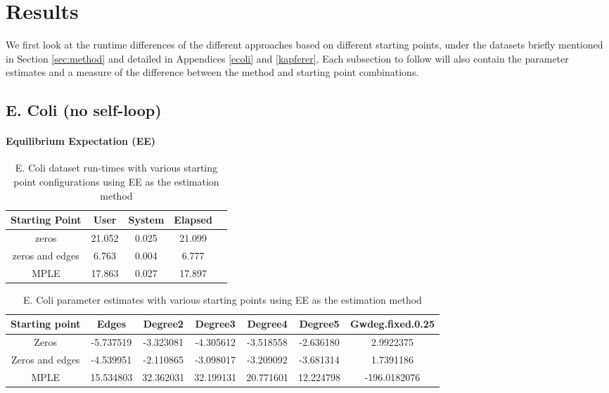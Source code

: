 \section{Results}
\label{sec:results}

We first look at the runtime differences of the different approaches based on different starting points, under the datasets briefly mentioned in Section \ref{sec:method} and detailed in Appendices \ref{ecoli} and \ref{kapferer}. Each subsection to follow will also contain the parameter estimates and a measure of the difference between the method and starting point combinations.

\subsection{E. Coli (no self-loop)}

\paragraph{Equilibrium Expectation (EE)}

\begin{table}[H]
 \centering
 \begin{tabular}{||c | c | c | c | c||} 
 \hline
 Starting Point & User & System & Elapsed \\
 \hline\hline
 zeros & 21.052 & 0.025 & 21.099 \\ 
 \hline
 zeros and edges & 6.763 & 0.004 & 6.777 \\
 \hline
 MPLE & 17.863 & 0.027 & 17.897 \\
 \hline
 \end{tabular}
 \label{t:ecoli1_ee}
 \caption{E. Coli dataset run-times with various starting point configurations using EE as the estimation method}
\end{table}

\begin{table}[H]
\centering
\begin{tabular}{|| c | c | c | c | c | c | c ||}
\hline
Starting point & Edges & Degree2 & Degree3 & Degree4 & Degree5 & Gwdeg.fixed.0.25 \\
\hline
Zeros & -5.737519 & -3.323081 & -4.305612 & -3.518558 & -2.636180 & 2.9922375 \\
\hline
Zeros and edges & -4.539951 &-2.110865 & -3.098017 & -3.209092 & -3.681314 & 1.7391186 \\
\hline
MPLE & 15.534803 & 32.362031 & 32.199131 & 20.771601 & 12.224798 & -196.0182076 \\
\hline
\end{tabular}
\label{t:params_ecoli_ee}
\caption{E. Coli parameter estimates with various starting points using EE as the estimation method}
\end{table}

